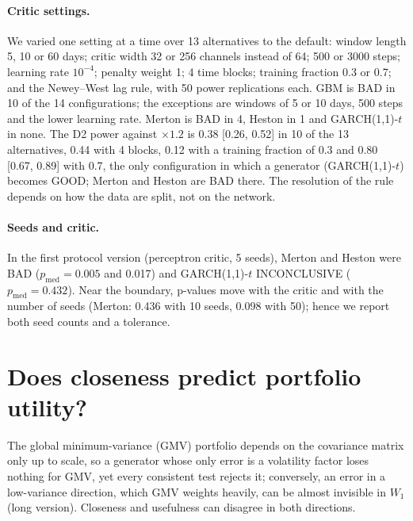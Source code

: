 \documentclass[11pt,a4paper]{article}
\theoremstyle{plain}
\newcommand{\W}{W_{1}}
\newcommand{\pmed}{p_{\mathrm{med}}}
\newcommand{\GOOD}{\textsf{GOOD}}
\newcommand{\BAD}{\textsf{BAD}}
\newcommand{\INCONCL}{\textsf{INCONCLUSIVE}}
\newcommand{\GARCHt}{GARCH(1,1)-$t$}
\begin{document}
\paragraph{Critic settings.} We varied one setting at a time over 13 alternatives to the default:
window length 5, 10 or 60 days; critic width 32 or 256 channels instead of 64; 500 or 3000 steps;
learning rate $10^{-4}$; penalty weight 1; 4 time blocks; training fraction 0.3 or 0.7; and the
Newey--West lag rule, with 50 power replications each. GBM is \BAD{} in 10 of the 14
configurations; the exceptions are windows of 5 or 10 days, 500 steps and the lower learning rate.
Merton is \BAD{} in 4, Heston in 1 and \GARCHt{} in none. The D2 power against $\times1.2$ is 0.38
[0.26, 0.52] in 10 of the 13 alternatives, 0.44 with 4 blocks, 0.12 with a training fraction of 0.3
and 0.80 [0.67, 0.89] with 0.7, the only configuration in which a generator (\GARCHt{}) becomes
\GOOD{}; Merton and Heston are \BAD{} there. The resolution of the rule depends on how the data are
split, not on the network.

\paragraph{Seeds and critic.} In the first protocol version (perceptron critic, 5 seeds), Merton and
Heston were \BAD{} ($\pmed=0.005$ and 0.017) and \GARCHt{} \INCONCL{} ($\pmed=0.432$). Near the
boundary, p-values move with the critic and with the number of seeds (Merton: 0.436 with 10 seeds,
0.098 with 50); hence we report both seed counts and a tolerance.

\section{Does closeness predict portfolio utility?}\label{sec:mk}

The global minimum-variance (GMV) portfolio depends on the covariance matrix only up to scale, so a
generator whose only error is a volatility factor loses nothing for GMV, yet every consistent test
rejects it; conversely, an error in a low-variance direction, which GMV weights heavily, can be
almost invisible in $\W$ (long version). Closeness and usefulness can disagree in both directions.
\end{document}
